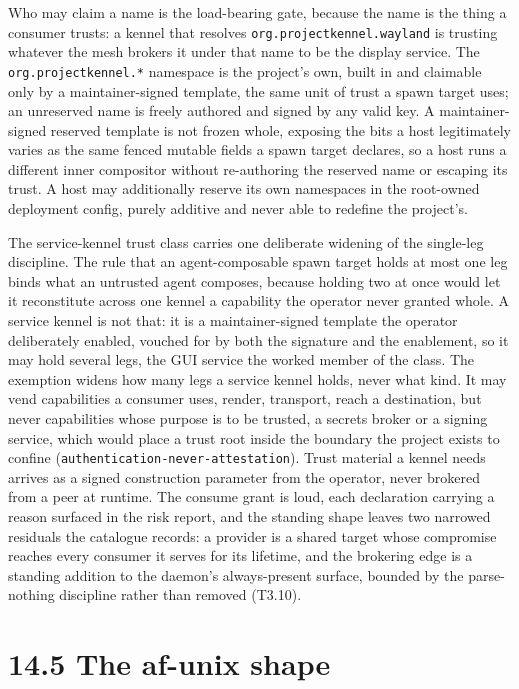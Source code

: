 Who may claim a name is the load-bearing gate, because the name is the
thing a consumer trusts: a kennel that resolves
\texttt{org.projectkennel.wayland} is trusting whatever the mesh brokers
it under that name to be the display service. The
\texttt{org.projectkennel.*} namespace is the project's own, built in
and claimable only by a maintainer-signed template, the same unit of
trust a spawn target uses; an unreserved name is freely authored and
signed by any valid key. A maintainer-signed reserved template is not
frozen whole, exposing the bits a host legitimately varies as the same
fenced mutable fields a spawn target declares, so a host runs a
different inner compositor without re-authoring the reserved name or
escaping its trust. A host may additionally reserve its own namespaces
in the root-owned deployment config, purely additive and never able to
redefine the project's.

The service-kennel trust class carries one deliberate widening of the
single-leg discipline. The rule that an agent-composable spawn target
holds at most one leg binds what an untrusted agent composes, because
holding two at once would let it reconstitute across one kennel a
capability the operator never granted whole. A service kennel is not
that: it is a maintainer-signed template the operator deliberately
enabled, vouched for by both the signature and the enablement, so it may
hold several legs, the GUI service the worked member of the class. The
exemption widens how many legs a service kennel holds, never what kind.
It may vend capabilities a consumer uses, render, transport, reach a
destination, but never capabilities whose purpose is to be trusted, a
secrets broker or a signing service, which would place a trust root
inside the boundary the project exists to confine
(\texttt{authentication-never-attestation}). Trust material a kennel
needs arrives as a signed construction parameter from the operator,
never brokered from a peer at runtime. The consume grant is loud, each
declaration carrying a reason surfaced in the risk report, and the
standing shape leaves two narrowed residuals the catalogue records: a
provider is a shared target whose compromise reaches every consumer it
serves for its lifetime, and the brokering edge is a standing addition
to the daemon's always-present surface, bounded by the parse-nothing
discipline rather than removed (T3.10).

\hypertarget{the-af-unix-shape}{%
\section{14.5 The af-unix shape}\label{the-af-unix-shape}}

